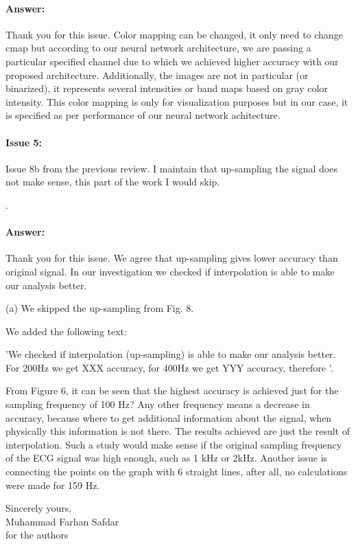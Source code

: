 \documentclass{article}
\begin{document}
\paragraph{Answer:}
Thank you for this issue. Color mapping can be changed, it only need to change cmap but according to our neural network architecture, we are passing a particular specified channel due to which we achieved higher accuracy with our proposed architecture. Additionally, the images are not in particular (or binarized), it represents several intensities or band maps based on gray color intensity. This color mapping is only for visualization purposes but in our case, it is specified as per performance of our neural network achitecture. 

\paragraph{Issue 5:}
\begin{displayquote}
Issue 8b from the previous review. I maintain that up-sampling the signal does not make sense, this part of the work I would skip.
\end{displayquote}.

\paragraph{Answer:}
Thank you for this issue. 
We agree that up-sampling gives lower accuracy than original signal.
In our investigation we checked if interpolation is able to make our analysis better.

(a) We skipped the up-sampling from Fig. 8.

We added the following text:

'We checked if interpolation (up-sampling) is able to make our analysis better. For 200Hz we get XXX accuracy, for 400Hz we get YYY accuracy,
therefore '.

From Figure 6, it can be seen that the highest accuracy is achieved just for the sampling frequency of 100 Hz? Any other frequency means a decrease in accuracy, because where to get additional information about the signal, when physically this information is not there. The results achieved are just the result of interpolation. Such a study would make sense if the original sampling frequency of the ECG signal was high enough, such as 1 kHz or 2kHz. Another issue is connecting the points on the graph with 6 straight lines, after all, no calculations were made for 159 Hz.


\vspace{0.25in}

Sincerely yours,\\
Muhammad Farhan Safdar\\
for the authors
\end{document}
